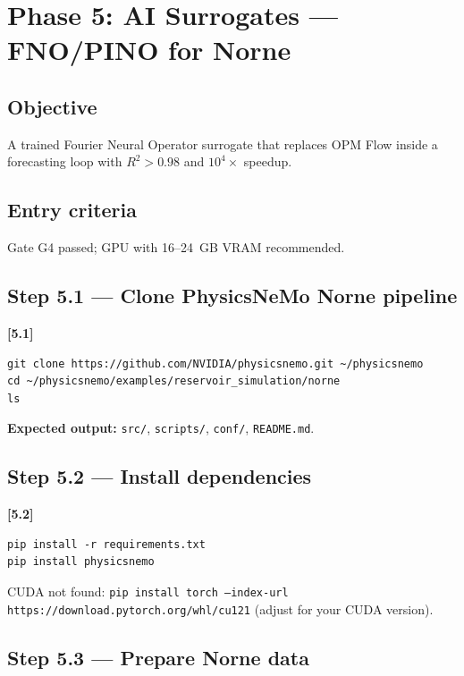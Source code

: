 \documentclass[10pt,a4paper]{article}
\newcommand{\stepID}[1]{\textsf{\textbf{[#1]}}}
\newcommand{\cmd}[1]{\texttt{#1}}
\begin{document}
\section{Phase 5: AI Surrogates --- FNO/PINO for Norne}
\label{sec:phase5}

\subsection{Objective}
A trained Fourier Neural Operator surrogate that replaces OPM Flow inside a forecasting loop with $R^2 > 0.98$ and $10^4\times$ speedup.

\subsection{Entry criteria}
Gate G4 passed; GPU with 16--24~GB VRAM recommended.

\subsection{Step 5.1 --- Clone PhysicsNeMo Norne pipeline}

\stepID{5.1}
\begin{lstlisting}[style=sh]
git clone https://github.com/NVIDIA/physicsnemo.git ~/physicsnemo
cd ~/physicsnemo/examples/reservoir_simulation/norne
ls
\end{lstlisting}

\textbf{Expected output:} \cmd{src/}, \cmd{scripts/}, \cmd{conf/}, \cmd{README.md}.

\subsection{Step 5.2 --- Install dependencies}

\stepID{5.2}
\begin{lstlisting}[style=sh]
pip install -r requirements.txt
pip install physicsnemo
\end{lstlisting}

\begin{failure}
CUDA not found: \cmd{pip install torch --index-url https://download.pytorch.org/whl/cu121} (adjust for your CUDA version).
\end{failure}

\subsection{Step 5.3 --- Prepare Norne data}
\end{document}
